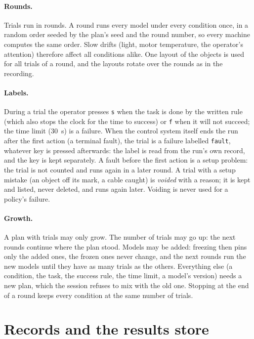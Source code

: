 \paragraph{Rounds.} Trials run in rounds. A round runs every model under every condition once, in a random order
seeded by the plan's seed and the round number, so every machine computes the same order. Slow drifts (light, motor
temperature, the operator's attention) therefore affect all conditions alike. One layout of the objects is used for all
trials of a round, and the layouts rotate over the rounds as in the recording.

\paragraph{Labels.} During a trial the operator presses \texttt{s} when the task is done by the written rule (which
also stops the clock for the time to success) or \texttt{f} when it will not succeed; the time limit (30~s) is a
failure. When the control system itself ends the run after the first action (a terminal fault), the trial is a failure
labelled \texttt{fault}, whatever key is pressed afterwards: the label is read from the run's own record, and the key
is kept separately. A fault before the first action is a setup problem: the trial is not counted and runs again in a
later round. A trial with a setup mistake (an object off its mark, a cable caught) is \emph{voided} with a reason; it is
kept and listed, never deleted, and runs again later. Voiding is never used for a policy's failure.

\paragraph{Growth.}\label{sec:growth} A plan with trials may only grow. The number of trials may go up: the next rounds
continue where the plan stood. Models may be added: freezing then pins only the added ones, the frozen ones never
change, and the next rounds run the new models until they have as many trials as the others. Everything else (a
condition, the task, the success rule, the time limit, a model's version) needs a new plan, which the session refuses
to mix with the old one. Stopping at the end of a round keeps every condition at the same number of trials.


\section{Records and the results store}\label{sec:records}

